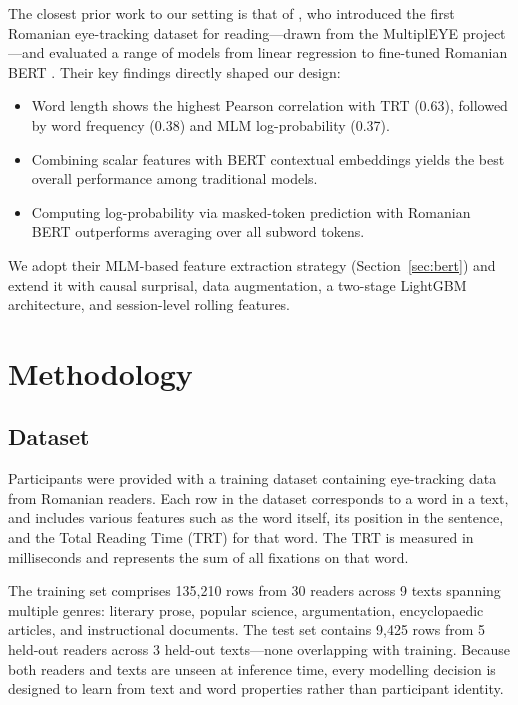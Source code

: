 \documentclass[12pt]{article}
\begin{document}
The closest prior work to our setting is that of \citeauthor{hodivoianu2025predicting}, who introduced the first Romanian eye-tracking dataset for reading---drawn from the MultiplEYE project \cite{jakobi2025multipleye}---and evaluated a range of models from linear regression to fine-tuned Romanian BERT \cite{dumitrescu2020birth}. Their key findings directly shaped our design:
\begin{itemize}
  \item Word length shows the highest Pearson correlation with TRT (0.63), followed by word frequency (0.38) and MLM log-probability (0.37).
  \item Combining scalar features with BERT contextual embeddings yields the best overall performance among traditional models.
  \item Computing log-probability via masked-token prediction with Romanian BERT outperforms averaging over all subword tokens.
\end{itemize}
We adopt their MLM-based feature extraction strategy (Section~\ref{sec:bert}) and extend it with causal surprisal, data augmentation, a two-stage LightGBM architecture, and session-level rolling features.

\section{Methodology}

\subsection{Dataset}

Participants were provided with a training dataset containing eye-tracking data from Romanian readers. Each row in the dataset corresponds to a word in a text, and includes various features such as the word itself, its position in the sentence, and the Total Reading Time (TRT) for that word. The TRT is measured in milliseconds and represents the sum of all fixations on that word.

The training set comprises 135,210 rows from 30 readers across 9 texts spanning multiple genres: literary prose, popular science, argumentation, encyclopaedic articles, and instructional documents. The test set contains 9,425 rows from 5 held-out readers across 3 held-out texts---none overlapping with training. Because both readers and texts are unseen at inference time, every modelling decision is designed to learn from text and word properties rather than participant identity.
\end{document}
